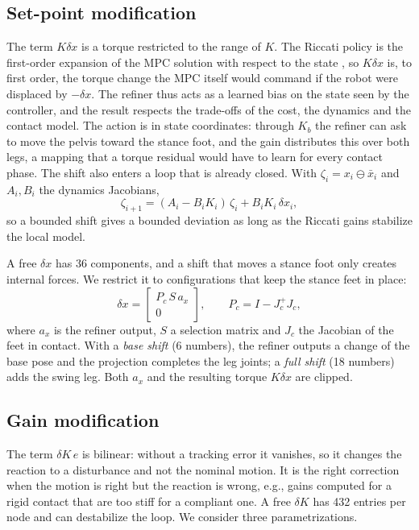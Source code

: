 \documentclass[conference]{IEEEtran}
\newcommand{\xb}{\bar{x}}
\begin{document}
\subsection{Set-point modification}
The term $K\delta x$ is a torque restricted to the range of $K$.
The Riccati policy is the first-order expansion of the MPC solution with respect to the state \cite{dantec2022firstorder}, so $K\delta x$ is, to first order, the torque change the MPC itself would command if the robot were displaced by $-\delta x$.
The refiner thus acts as a learned bias on the state seen by the controller, and the result respects the trade-offs of the cost, the dynamics and the contact model.
The action is in state coordinates: through $K_b$ the refiner can ask to move the pelvis toward the stance foot, and the gain distributes this over both legs, a mapping that a torque residual would have to learn for every contact phase.
The shift also enters a loop that is already closed.
With $\zeta_i=x_i\ominus\xb_i$ and $A_i,B_i$ the dynamics Jacobians,
\begin{equation}
\zeta_{i+1}=(A_i-B_iK_i)\,\zeta_i+B_iK_i\,\delta x_i ,
\label{eq:cl}
\end{equation}
so a bounded shift gives a bounded deviation as long as the Riccati gains stabilize the local model.

A free $\delta x$ has 36 components, and a shift that moves a stance foot only creates internal forces.
We restrict it to configurations that keep the stance feet in place:
\begin{equation}
\delta x=\begin{bmatrix}P_c\,S\,a_x\\ 0\end{bmatrix},\qquad P_c=I-J_c^{+}J_c ,
\label{eq:setpoint}
\end{equation}
where $a_x$ is the refiner output, $S$ a selection matrix and $J_c$ the Jacobian of the feet in contact.
With a \emph{base shift} (6 numbers), the refiner outputs a change of the base pose and the projection completes the leg joints; a \emph{full shift} (18 numbers) adds the swing leg.
Both $a_x$ and the resulting torque $K\delta x$ are clipped.

\subsection{Gain modification}
The term $\delta K\,e$ is bilinear: without a tracking error it vanishes, so it changes the reaction to a disturbance and not the nominal motion.
It is the right correction when the motion is right but the reaction is wrong, e.g., gains computed for a rigid contact that are too stiff for a compliant one.
A free $\delta K$ has 432 entries per node and can destabilize the loop.
We consider three parametrizations.
\end{document}

